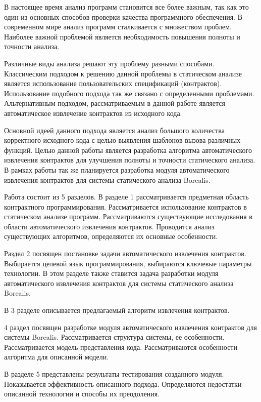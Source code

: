 \intro
В настоящее время анализ программ становится все более важным, так как это один из основных способов проверки качества программного обеспечения. В современном мире анализ программ сталкивается с множеством проблем.  Наиболее важной проблемой является необходимость повышения полноты и точности анализа.

Различные виды анализа решают эту проблему разными способами. Классическим подходом к решению данной проблемы в статическом анализе является использование пользовательских спецификаций (контрактов). Использование подобного подхода так же связано с определенными проблемами. Альтернативным подходом, рассматриваемым в данной работе является автоматическое извлечение контрактов из исходного кода.

Основной идеей данного подхода является анализ большого количества корректного исходного кода с целью выявления шаблонов вызова различных функций. Целью данной работы является разработка алгоритма автоматического извлечения контрактов для улучшения полноты и точности статического анализа. В рамках работы так же планируется разработка модуля автоматического извлечения контрактов для системы статического анализа Borealis\cite{borealis}.

Работа состоит из 5 разделов. В разделе 1 рассматривается предметная область контрактного программирования. Рассматривается использование контрактов в статическом анализе программ. Рассматриваются существующие исследования в области автоматического извлечения контрактов. Проводится анализ существующих алгоритмов, определяются их основные особенности.

Раздел 2 посвящен постановке задачи автоматического извлечения контрактов. Выбирается целевой язык программирования, выбираются ключевые параметры технологии. В этом разделе также ставится задача разработки модуля автоматического извлечения контрактов для системы статического анализа Borealis.

В 3 разделе описывается предлагаемый алгоритм извлечения контрактов.

4 раздел посвящен разработке модуля автоматического извлечения контрактов для системы Borealis. Рассматривается структура системы, ее особенности. Рассматривается модель представления кода. Рассматриваются особенности алгоритма для описанной модели.

В разделе 5 представлены результаты тестирования созданного модуля. Показывается эффективность описанного подхода. Определяются недостатки описанной технологии и способы их преодоления.
